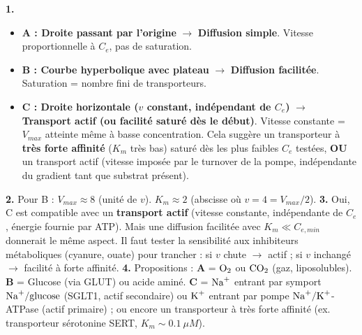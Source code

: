 \documentclass[11pt]{article}
\begin{document}
\begin{corrige}
\textbf{1.}
\begin{itemize}
    \item \textbf{A : Droite passant par l'origine} $\rightarrow$ \textbf{Diffusion simple}. Vitesse proportionnelle à $C_e$, pas de saturation.
    \item \textbf{B : Courbe hyperbolique avec plateau} $\rightarrow$ \textbf{Diffusion facilitée}. Saturation = nombre fini de transporteurs.
    \item \textbf{C : Droite horizontale ($v$ constant, indépendant de $C_e$)} $\rightarrow$ \textbf{Transport actif (ou facilité saturé dès le début)}. Vitesse constante = $V_{max}$ atteinte même à basse concentration. Cela suggère un transporteur à \textbf{très forte affinité} ($K_m$ très bas) saturé dès les plus faibles $C_e$ testées, \textbf{OU} un transport actif (vitesse imposée par le turnover de la pompe, indépendante du gradient tant que substrat présent).
\end{itemize}
\textbf{2.} Pour B : $V_{max} \approx 8$ (unité de $v$). $K_m \approx 2$ (abscisse où $v = 4 = V_{max}/2$).
\textbf{3.} Oui, C est compatible avec un \textbf{transport actif} (vitesse constante, indépendante de $C_e$, énergie fournie par ATP). Mais une diffusion facilitée avec $K_m \ll C_{e,min}$ donnerait le même aspect. Il faut tester la sensibilité aux inhibiteurs métaboliques (cyanure, ouate) pour trancher : si $v$ chute $\rightarrow$ actif ; si $v$ inchangé $\rightarrow$ facilité à forte affinité.
\textbf{4.} Propositions : \textbf{A} = $\ce{O2}$ ou $\ce{CO2}$ (gaz, liposolubles). \textbf{B} = Glucose (via GLUT) ou acide aminé. \textbf{C} = $\ce{Na+}$ entrant par symport $\ce{Na+/glucose}$ (SGLT1, actif secondaire) ou $\ce{K+}$ entrant par pompe $\ce{Na+/K+}$-ATPase (actif primaire) ; ou encore un transporteur à très forte affinité (ex. transporteur sérotonine SERT, $K_m \sim \SI{0,1}{\mu M}$).
\end{corrige}
\end{document}
